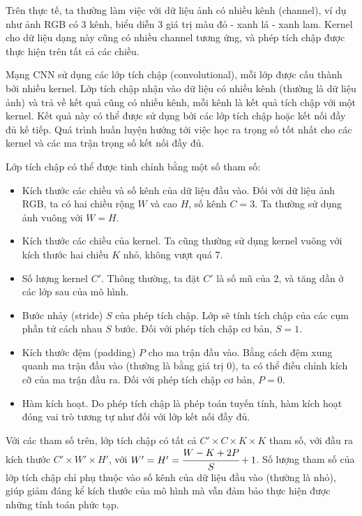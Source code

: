 \documentclass[12pt]{extreport}
\begin{document}
Trên thực tế, ta thường làm việc với dữ liệu ảnh có nhiều kênh (channel), ví dụ như ảnh RGB có 3 kênh, biểu diễn 3 giá trị màu đỏ - xanh lá - xanh lam. Kernel cho dữ liệu dạng này cũng có nhiều channel tương ứng, và phép tích chập được thực hiện trên tất cả các chiều.

Mạng CNN sử dụng các lớp tích chập (convolutional), mỗi lớp được cấu thành bởi nhiều kernel. Lớp tích chập nhận vào dữ liệu có nhiều kênh (thường là dữ liệu ảnh) và trả về kết quả cũng có nhiều kênh, mỗi kênh là kết quả tích chập với một kernel. Kết quả này có thể được sử dụng bởi các lớp tích chập hoặc kết nối đầy đủ kế tiếp. Quá trình huấn luyện hướng tới việc học ra trọng số tốt nhất cho các kernel và các ma trận trọng số kết nối đầy đủ.

Lớp tích chập có thể được tinh chỉnh bằng một số tham số:
\begin{itemize}
    \item Kích thước các chiều và số kênh của dữ liệu đầu vào. Đối với dữ liệu ảnh RGB, ta có hai chiều rộng $ W $ và cao $ H $, số kênh $ C = 3 $. Ta thường sử dụng ảnh vuông với $ W = H $.
    \item Kích thước các chiều của kernel. Ta cũng thường sử dụng kernel vuông với kích thước hai chiều $ K $ nhỏ, không vượt quá 7.
    \item Số lượng kernel $ C' $. Thông thường, ta đặt $ C' $ là số mũ của 2, và tăng dần ở các lớp sau của mô hình.
    \item Bước nhảy (stride) $ S $ của phép tích chập. Lớp sẽ tính tích chập của các cụm phần tử cách nhau $ S $ bước. Đối với phép tích chập cơ bản, $ S = 1 $.
    \item Kích thước đệm (padding) $ P $ cho ma trận đầu vào. Bằng cách đệm xung quanh ma trận đầu vào (thường là bằng giá trị 0), ta có thể điều chỉnh kích cỡ của ma trận đầu ra. Đối với phép tích chập cơ bản, $ P = 0 $.
    \item Hàm kích hoạt. Do phép tích chập là phép toán tuyến tính, hàm kích hoạt đóng vai trò tương tự như đối với lớp kết nối đầy đủ.
\end{itemize}

Với các tham số trên, lớp tích chập có tất cả $ C' \times C \times K \times K $ tham số, với đầu ra kích thước $ C' \times W' \times H' $, với $ W' = H' = \cfrac{W - K + 2P}{S} + 1 $. Số lượng tham số của lớp tích chập chỉ phụ thuộc vào số kênh của dữ liệu đầu vào (thường là nhỏ), giúp giảm đáng kể kích thước của mô hình mà vẫn đảm bảo thực hiện được những tính toán phức tạp.
\end{document}
